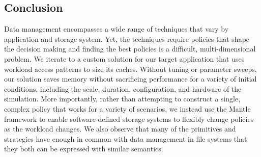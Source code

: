 \subsection{Conclusion}

Data management encompasses a wide range of techniques that vary by application
and storage system.  Yet, the techniques require policies that shape the
decision making and finding the best policies is a difficult, multi-dimensional
problem.  We iterate to a custom solution for our target application that uses
workload access patterns to size its caches. Without tuning or parameter
sweeps, our solution saves memory without sacrificing performance for a variety
of initial conditions, including the scale, duration, configuration, and
hardware of the simulation. More importantly, rather than attempting to
construct a single, complex policy that works for a variety of scenarios, we
instead use the Mantle framework to enable software-defined storage systems to
flexibly change policies as the workload changes.  We also observe that many of
the primitives and strategies have enough in common with data management in
file systems that they both can be expressed with similar semantics.


